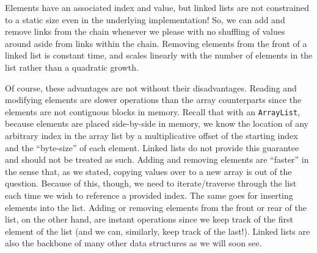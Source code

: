 Elements have an associated index and value, but linked lists are not constrained to a static size even in the underlying implementation! So, we can add and remove links from the chain whenever we please with no shuffling of values around aside from links within the chain. Removing elements from the front of a linked list is constant time, and scales linearly with the number of elements in the list rather than a quadratic growth.

Of course, these advantages are not without their disadvantages. Reading and modifying elements are slower operations than the array counterparts since the elements are not contiguous blocks in memory. Recall that with an \texttt{ArrayList}, because elements are placed side-by-side in memory, we know the location of any arbitrary index in the array list by a multiplicative offset of the starting index and the ``byte-size'' of each element. Linked lists do not provide this guarantee and should not be treated as such. Adding and removing elements are ``faster'' in the sense that, as we stated, copying values over to a new array is out of the question. Because of this, though, we need to iterate/traverse through the list each time we wish to reference a provided index. The same goes for inserting elements into the list. Adding or removing elements from the front or rear of the list, on the other hand, are instant operations since we keep track of the first element of the list (and we can, similarly, keep track of the last!). Linked lists are also the backbone of many other data structures as we will soon see.
